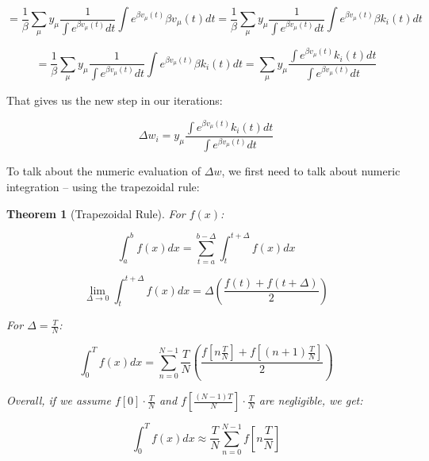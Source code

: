 \begin{equation}
= \frac{1}{\beta}\sum_{\mu}{y_{\mu}\frac{1}{\int e^{\beta v_{\mu}(t)} dt}\int e^{\beta v_{\mu}(t)} \beta v_{\mu}(t) dt} = \frac{1}{\beta}\sum_{\mu}{y_{\mu}\frac{1}{\int e^{\beta v_{\mu}(t)} dt}\int e^{\beta v_{\mu}(t)} \beta k_i(t) dt}
\end{equation}

\begin{equation}
= \frac{1}{\beta}\sum_{\mu}{y_{\mu}\frac{1}{\int e^{\beta v_{\mu}(t)} dt}\int e^{\beta v_{\mu}(t)} \beta k_i(t) dt} = \sum_{\mu}{y_{\mu}\frac{\int e^{\beta v_{\mu}(t)} k_i(t) dt}{\int e^{\beta v_{\mu}(t)} dt}}
\end{equation}

That gives us the new step in our iterations:

\begin{equation}
\Delta w_i = y_{\mu}\frac{\int e^{\beta v_{\mu}(t)} k_i(t) dt}{\int e^{\beta v_{\mu}(t)} dt}
\end{equation}

To talk about the numeric evaluation of $\Delta w$, we first need to talk about numeric integration – using the trapezoidal rule:

\newtheorem{theorem}{Theorem}

\begin{mdframed}[linewidth=2pt, frametitlerule=true, frametitlebackgroundcolor=gray!20, innertopmargin=10pt, innerbottommargin=10pt]
    \begin{theorem}[Trapezoidal Rule]
        For $f(x)$:
        
        \begin{equation*}
            \int_a^b f(x) dx = \sum_{t=a}^{b-\Delta} \int_t^{t+\Delta} f(x) dx
        \end{equation*}

        \begin{equation*}
            \lim_{{\Delta\to0}} \int_t^{t+\Delta} f(x) dx = \Delta \left(\frac{f(t)+f(t+\Delta)}{2}\right)
        \end{equation*}

        For $\Delta = \frac{T}{N}$:

        \begin{equation*}
            \int_0^T f(x) dx = \sum_{n=0}^{N-1} \frac{T}{N}\left(\frac{f[n\frac{T}{N}]+f[(n+1)\frac{T}{N}]}{2}\right)
        \end{equation*}

        Overall, if we assume $f[0] \cdot \frac{T}{N}$ and $f\left[\frac{(N-1)T}{N}\right] \cdot \frac{T}{N}$ are negligible, we get:

        \begin{equation*}
            \int_0^T f(x) dx \approx \frac{T}{N}\sum_{n=0}^{N-1} f[n\frac{T}{N}]
        \end{equation*}
    \end{theorem}
\end{mdframed}

